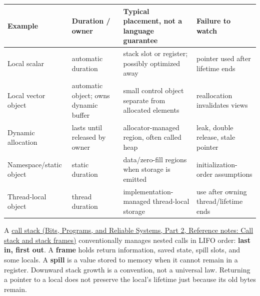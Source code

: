 {\def\LTcaptype{none} %
\begin{longtable}[]{@{}
  >{\raggedright\arraybackslash}p{}
  >{\raggedright\arraybackslash}p{}
  >{\raggedright\arraybackslash}p{}
  >{\raggedright\arraybackslash}p{}@{}}
\toprule\noalign{}
\begin{minipage}[b]{\linewidth}\raggedright
Example
\end{minipage} & \begin{minipage}[b]{\linewidth}\raggedright
Duration / owner
\end{minipage} & \begin{minipage}[b]{\linewidth}\raggedright
Typical placement, not a language guarantee
\end{minipage} & \begin{minipage}[b]{\linewidth}\raggedright
Failure to watch
\end{minipage} \\
\midrule\noalign{}
\endhead
\bottomrule\noalign{}
\endlastfoot
Local scalar & automatic duration & stack slot or register; possibly optimized away & pointer used after lifetime ends \\
Local vector object & automatic object; owns dynamic buffer & small control object separate from allocated elements & reallocation invalidates views \\
Dynamic allocation & lasts until released by owner & allocator-managed region, often called heap & leak, double release, stale pointer \\
Namespace/static object & static duration & data/zero-fill regions when storage is emitted & initialization-order assumptions \\
Thread-local object & thread duration & implementation-managed thread-local storage & use after owning thread/lifetime ends \\
\end{longtable}
}

A \href{../01-Bits-Programs-and-Reliable-Systems-P02/main.pdf\#nameddest=appendix-b081b7abe193}{call stack (Bits, Programs, and Reliable Systems, Part 2, Reference notes: Call stack and stack frames)} conventionally manages nested calls in LIFO order: \textbf{last in, first out}. A \textbf{frame} holds return information, saved state, spill slots, and some locals. A \textbf{spill} is a value stored to memory when it cannot remain in a register. Downward stack growth is a convention, not a universal law. Returning a pointer to a local does not preserve the local's lifetime just because its old bytes remain.

